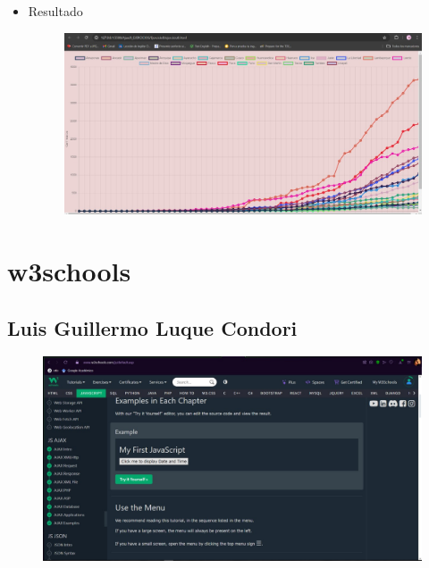 \documentclass{article}
\begin{document}
\begin{itemize}
\begin{figure}[H]
		\end{figure}
		\item Resultado
		\begin{figure}[H]
			\centering
			\includegraphics[width=1.0\textwidth,keepaspectratio]{img/Ejer8T2Result.jpg}
		\end{figure}
	\end{itemize}


	\section{w3schools}

	\subsection{Luis Guillermo Luque Condori}
	\begin{figure}[H]
		\centering
		\includegraphics[width=1.0\textwidth,keepaspectratio]{img/wsLuis.jpg}
	\end{figure}
\end{document}
